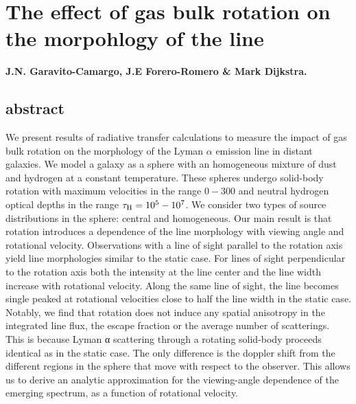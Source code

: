 
\chapter{The effect of gas bulk rotation on the morpohlogy of the \ly line} %

\label{sec:implementation} %


{\bf{J.N. Garavito-Camargo, J.E Forero-Romero \&  Mark Dijkstra.}}

\section*{abstract}
We present results of radiative transfer calculations to measure the
impact of gas bulk rotation on the morphology of the Lyman $\alpha$
emission line in distant galaxies.
We model a galaxy as a sphere with an homogeneous mixture of dust and
hydrogen at a constant temperature.
These spheres undergo solid-body rotation with maximum velocities in
the range $0-300$ \kms and neutral hydrogen optical depths in the
range $\tau_{\rm H}=10^{5}-10^{7}$.
We consider two types of source distributions in the sphere: central and
homogeneous.
Our main result is that rotation introduces a dependence of the
line morphology with viewing angle and rotational velocity.
Observations with a line of sight parallel to the rotation axis yield
line morphologies similar to the static case.
For lines of sight perpendicular to the rotation axis both the intensity at the line
center and the line width increase with rotational velocity.
Along the same line of sight, the line becomes single peaked at rotational
velocities close to half the line width in the static case.
Notably, we find that rotation does not induce any spatial anisotropy in the integrated line flux, the escape fraction or the average number of scatterings. This is because Lyman α scattering through a rotating solid-body proceeds identical as in the static case. The only difference is the doppler shift from the different
regions in the sphere that move with respect to the observer. This
allows us to derive an analytic approximation for the viewing-angle
dependence of the emerging spectrum, as a function of rotational velocity.

